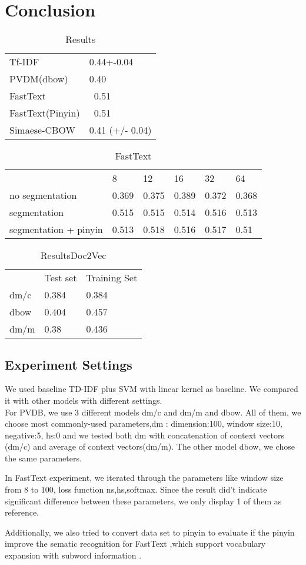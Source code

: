\chapter{Conclusion}

\begin{table}[]
\centering
\caption{Results}
\label{resultAll}
\begin{tabular}{ll}
Tf-IDF   & 0.44+-0.04 \\
PVDM(dbow) & 0.40    \\
FastText &  ~0.51   \\
FastText(Pinyin) &  ~0.51  \\
Simaese-CBOW & 0.41 (+/- 0.04)
\end{tabular}
\end{table}

\begin{table}[]
\centering
\caption{FastText}
\label{fasttext}
\begin{tabular}{llllll}
   & 8 & 12 & 16 & 32 & 64 \\
no segmentation  & 0.369 & 0.375 & 0.389 & 0.372 & 0.368 \\
segmentation  & 0.515 & 0.515 & 0.514 & 0.516 & 0.513 \\
segmentation + pinyin  & 0.513 & 0.518 & 0.516 & 0.517 & 0.51 \\
\end{tabular}
\end{table}

\begin{table}[]
\centering
\caption{ResultsDoc2Vec}
\label{resultAll}
\begin{tabular}{lll}
      & Test set & Training Set \\
dm/c  & 0.384 &  0.384 \\
dbow &  0.404  & 0.457 \\
dm/m &  0.38  & 0.436 
\end{tabular}
\end{table}


\section{Experiment Settings}


We used baseline TD-IDF plus SVM with linear kernel as baseline. We compared it with other models with different settings. \\

For PVDB, we use 3 different models dm/c and dm/m and dbow. All of them, we choose most commonly-used parameters,dm : dimension:100, window size:10, negative:5, hs:0 and we tested both dm with concatenation of context vectors (dm/c) and average of context vectors(dm/m). The other model dbow, we chose the same parameters.

In FastText experiment, we iterated through the parameters like window size from 8 to 100, loss function ns,hs,softmax.  Since the result did't indicate significant difference between these parameters, we only display 1 of them as reference.

Additionally, we also tried to convert data set to pinyin to evaluate if the pinyin improve the sematic recognition for FastText ,which support vocabulary expansion with subword information \cite{bojanowski2016enriching}. 